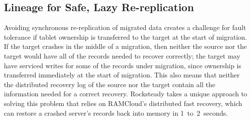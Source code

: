 \subsection{Lineage for Safe, Lazy Re-replication}
\label{sec:log-dep}

%
%

Avoiding synchronous re-replication of migrated data creates a
challenge for fault tolerance if tablet ownership is transferred to the target
at the start of migration. If the target crashes in the middle of a migration,
then neither the source nor the target would have all of the records needed to
recover correctly; the target may have serviced writes for some of the records
under migration, since ownership is transferred immediately at the start of
migration.  This also means that neither the distributed recovery log of
the source nor the target contain all the information needed for a correct
recovery. Rocksteady takes a unique approach to solving this problem that
relies on RAMCloud's distributed fast recovery, which can restore a crashed
server's records back into memory in 1~to~2~seconds.

